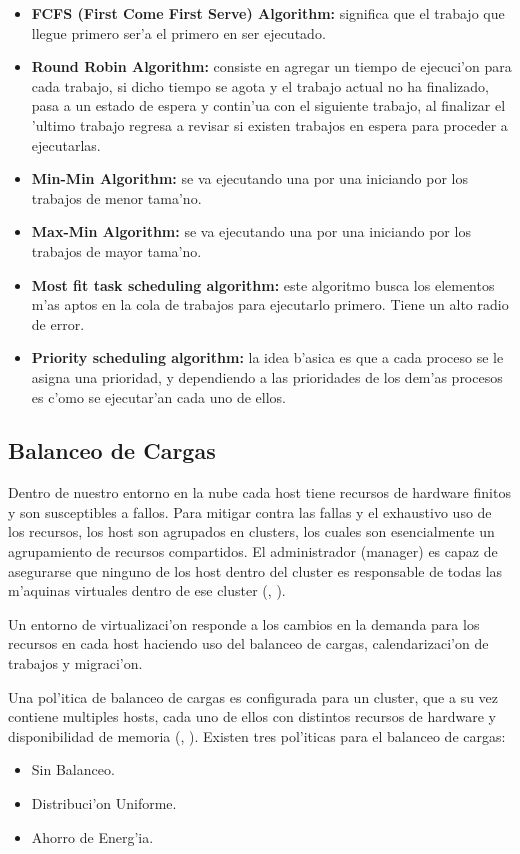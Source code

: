 \begin{itemize}
	\item \textbf{FCFS (First Come First Serve) Algorithm:} significa que el trabajo que llegue primero ser'a el primero en ser ejecutado.
	\item \textbf{Round Robin Algorithm:} consiste en agregar un tiempo de ejecuci'on para cada trabajo, si dicho tiempo se agota y el trabajo actual no ha finalizado, pasa a un estado de espera y contin'ua con el siguiente trabajo, al finalizar el 'ultimo trabajo regresa a revisar si existen trabajos en espera para proceder a ejecutarlas. 
	\item  \textbf{Min-Min Algorithm:} se va ejecutando una por una iniciando por los trabajos de menor tama'no.
	\item  \textbf{Max-Min Algorithm:} se va ejecutando una por una iniciando por los trabajos de mayor tama'no.
	\item  \textbf{Most fit task scheduling algorithm:} este algoritmo busca los elementos m'as aptos en la cola de trabajos para ejecutarlo primero. Tiene un alto radio de error.
	\item \textbf{Priority scheduling algorithm:} la idea b'asica es que a cada proceso se le asigna una prioridad, y dependiendo a las prioridades de los dem'as procesos es c'omo se ejecutar'an cada uno de ellos.
\end{itemize}

\subsection*{Balanceo de Cargas}

Dentro de nuestro entorno en la nube cada host tiene recursos de hardware finitos y son susceptibles a fallos. Para mitigar contra las fallas y el exhaustivo uso de los recursos, los host son agrupados en clusters, los cuales son esencialmente un agrupamiento de recursos compartidos. El administrador (manager) es capaz de asegurarse que ninguno de los host dentro del cluster es responsable de todas las m'aquinas virtuales dentro de ese cluster (\citeauthor{redhat}, \citeyear{redhat}).

Un entorno de virtualizaci'on responde a los cambios en la demanda para los recursos en cada host haciendo uso del balanceo de cargas, calendarizaci'on de trabajos y migraci'on.

Una pol'itica de balanceo de cargas es configurada para un cluster, que a su vez contiene multiples hosts, cada uno de ellos con distintos recursos de hardware y disponibilidad de memoria (\citeauthor{redhat}, \citeyear{redhat}). 
Existen tres pol'iticas para el balanceo de cargas:
\begin{itemize}
	\item Sin Balanceo.
	\item Distribuci'on Uniforme.
	\item Ahorro de Energ'ia.
\end{itemize}

